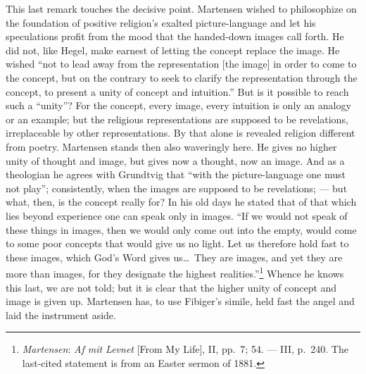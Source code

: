 \documentclass[12pt,a4paper]{book}
\newcommand{\opage}[1]{\marginnote{\footnotesize\textit{[#1]}}}
\begin{document}
This last remark touches the decisive point. Martensen wished to philosophize on the foundation of
positive religion's exalted picture-language and let his speculations profit from the mood that the
handed-down images call forth. He did not, like Hegel, make earnest of letting the concept replace
the image. He wished ``not to lead away from the representation [the image] in order to come to the
concept, but on the contrary to seek to clarify the representation through the concept, to present a
unity of concept and intuition.'' But is it possible to reach such a ``unity''? For the concept,
every image, every intuition is only an analogy or an example; but the religious representations are
supposed to \opage{144}be revelations, irreplaceable by other representations. By that alone is revealed
religion different from poetry. Martensen stands then also waveringly here. He gives no higher unity
of thought and image, but gives now a thought, now an image. And as a theologian he agrees with
Grundtvig that ``with the picture-language one must not play''; consistently, when the images are
supposed to be revelations; --- but what, then, is the concept really for? In his old days he
stated that of that which lies beyond experience one can speak only in images. ``If we would not
speak of these things in images, then we would only come out into the empty, would come to some poor
concepts that would give us no light. Let us therefore hold fast to these images, which God's Word
gives us\ldots\ They are images, and yet they are more than images, for they designate the highest
realities.''\footnote{\emph{Martensen}: \emph{Af mit Levnet} [From My Life], II, pp.~7; 54. --- III,
p.~240. The last-cited statement is from an Easter sermon of 1881.} Whence he knows this last, we
are not told; but it is clear that the higher unity of concept and image is given up. Martensen has,
to use Fibiger's simile, held fast the angel and laid the instrument aside.
\end{document}
